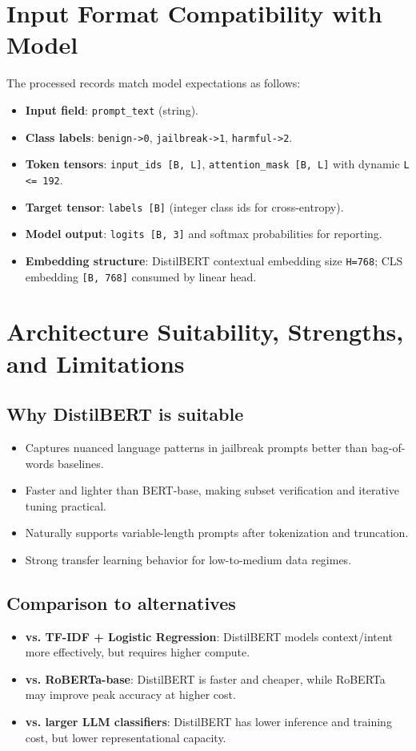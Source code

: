 \documentclass[11pt]{article}
\begin{document}
\section{Input Format Compatibility with Model}
The processed records match model expectations as follows:
\begin{itemize}[leftmargin=*]
\item \textbf{Input field}: \texttt{prompt\_text} (string).
\item \textbf{Class labels}: \texttt{benign->0}, \texttt{jailbreak->1}, \texttt{harmful->2}.
\item \textbf{Token tensors}: \texttt{input\_ids [B, L]}, \texttt{attention\_mask [B, L]} with dynamic \texttt{L <= 192}.
\item \textbf{Target tensor}: \texttt{labels [B]} (integer class ids for cross-entropy).
\item \textbf{Model output}: \texttt{logits [B, 3]} and softmax probabilities for reporting.
\item \textbf{Embedding structure}: DistilBERT contextual embedding size \texttt{H=768}; CLS embedding \texttt{[B, 768]} consumed by linear head.
\end{itemize}

\section{Architecture Suitability, Strengths, and Limitations}
\subsection{Why DistilBERT is suitable}
\begin{itemize}[leftmargin=*]
\item Captures nuanced language patterns in jailbreak prompts better than bag-of-words baselines.
\item Faster and lighter than BERT-base, making subset verification and iterative tuning practical.
\item Naturally supports variable-length prompts after tokenization and truncation.
\item Strong transfer learning behavior for low-to-medium data regimes.
\end{itemize}

\subsection{Comparison to alternatives}
\begin{itemize}[leftmargin=*]
\item \textbf{vs. TF-IDF + Logistic Regression}: DistilBERT models context/intent more effectively, but requires higher compute.
\item \textbf{vs. RoBERTa-base}: DistilBERT is faster and cheaper, while RoBERTa may improve peak accuracy at higher cost.
\item \textbf{vs. larger LLM classifiers}: DistilBERT has lower inference and training cost, but lower representational capacity.
\end{itemize}
\end{document}
